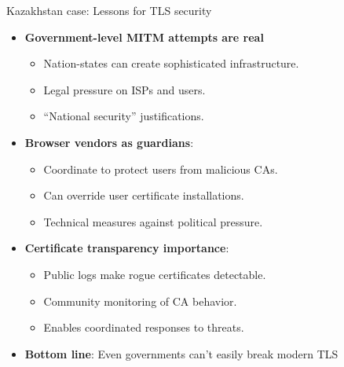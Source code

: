 \documentclass[aspectratio=169, lualatex, handout]{beamer}
\begin{document}
\begin{frame}{Kazakhstan case: Lessons for TLS security}
	\begin{itemize}
		\item \textbf{Government-level MITM attempts are real}
		      \begin{itemize}
			      \item Nation-states can create sophisticated infrastructure.
			      \item Legal pressure on ISPs and users.
			      \item ``National security'' justifications.
		      \end{itemize}
		\item \textbf{Browser vendors as guardians}:
		      \begin{itemize}
			      \item Coordinate to protect users from malicious CAs.
			      \item Can override user certificate installations.
			      \item Technical measures against political pressure.
		      \end{itemize}
		\item \textbf{Certificate transparency importance}:
		      \begin{itemize}
			      \item Public logs make rogue certificates detectable.
			      \item Community monitoring of CA behavior.
			      \item Enables coordinated responses to threats.
		      \end{itemize}
		\item \textbf{Bottom line}: Even governments can't easily break modern TLS
	\end{itemize}
\end{frame}
\end{document}
